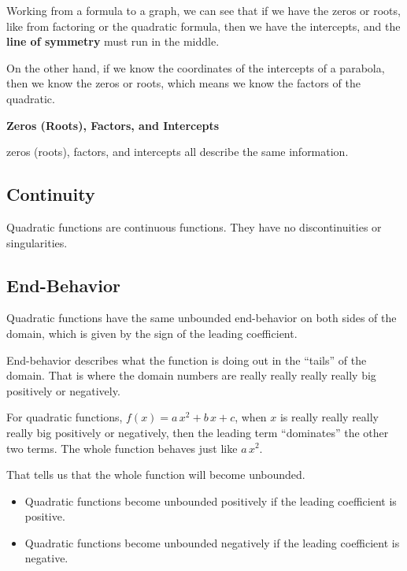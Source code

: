 \documentclass{ximera}
\begin{document}
Working from a formula to a graph, we can see that if we have the zeros or roots, like from factoring or the quadratic formula, then we have the intercepts, and the \textbf{line of symmetry} must run in the middle. 


On the other hand, if we know the coordinates of the intercepts of a parabola, then we know the zeros or roots, which means we know the factors of the quadratic.




\begin{idea} \textbf{\textcolor{blue!55!black}{Zeros (Roots), Factors, and Intercepts}} 


zeros (roots), factors, and intercepts all describe the same information.


\end{idea}






\subsection*{Continuity}

Quadratic functions are continuous functions.  They have no discontinuities or singularities. 












\subsection*{End-Behavior}

Quadratic functions have the same unbounded end-behavior on both sides of the domain, which is given by the sign of the leading coefficient. 


End-behavior describes what the function is doing out in the ``tails'' of the domain.  That is where the domain numbers are really really really really big positively or negatively. 

For quadratic functions, $f(x) = a \, x^2 + b \, x + c$, when $x$ is really really really really big positively or negatively, then the leading term ``dominates'' the other two terms.  The whole function behaves just like $a \, x^2$. 

That tells us that the whole function will become unbounded. 


\begin{itemize}
     \item Quadratic functions become unbounded positively if the leading coefficient is positive.
     \item Quadratic functions become unbounded negatively if the leading coefficient is negative.
\end{itemize}
\end{document}
